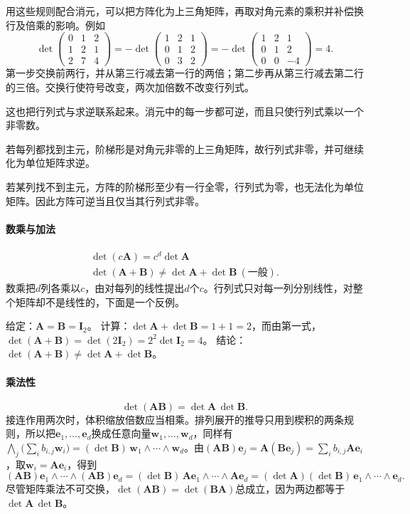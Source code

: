 用这些规则配合消元，可以把方阵化为上三角矩阵，再取对角元素的乘积并补偿换行及倍乘的影响。例如
\[
 \det\begin{pmatrix}0&1&2\\1&2&1\\2&7&4\end{pmatrix}
 =-\det\begin{pmatrix}1&2&1\\0&1&2\\0&3&2\end{pmatrix}
 =-\det\begin{pmatrix}1&2&1\\0&1&2\\0&0&-4\end{pmatrix}=4.
\]
第一步交换前两行，并从第三行减去第一行的两倍；第二步再从第三行减去第二行的三倍。交换行使符号改变，两次加倍数不改变行列式。

这也把行列式与求逆联系起来。消元中的每一步都可逆，而且只使行列式乘以一个非零数。

若每列都找到主元，阶梯形是对角元非零的上三角矩阵，故行列式非零，并可继续化为单位矩阵求逆。

若某列找不到主元，方阵的阶梯形至少有一行全零，行列式为零，也无法化为单位矩阵。因此方阵可逆当且仅当其行列式非零。

\paragraph{数乘与加法}
\[
\begin{gathered}
\det(c\bm A)=c^d\det\bm A\\
\det(\bm A+\bm B)\neq\det\bm A+\det\bm B\ (\text{一般}).
\end{gathered}
\]
数乘把$d$列各乘以$c$，由对每列的线性提出$d$个$c$。行列式只对每一列分别线性，对整个矩阵却不是线性的，下面是一个反例。
\begin{example}[反例：行列式不保持加法]
\label{ex:ls-det-not-additive}
给定：$\bm A=\bm B=\bm I_2$。
计算：$\det\bm A+\det\bm B=1+1=2$，而由第一式，$\det(\bm A+\bm B)=\det(2\bm I_2)=2^2\det\bm I_2=4$。
结论：$\det(\bm A+\bm B)\neq\det\bm A+\det\bm B$。
\end{example}

\paragraph{乘法性}
\[
 \det(\bm A\bm B)=\det\bm A\,\det\bm B.
\]
接连作用两次时，体积缩放倍数应当相乘。排列展开的推导只用到楔积的两条规则，所以把$\bm e_1,\ldots,\bm e_d$换成任意向量$\bm w_1,\ldots,\bm w_d$，同样有$\bigwedge_j\bigl(\sum_ib_{i,j}\bm w_i\bigr)=(\det\bm B)\,\bm w_1\wedge\cdots\wedge\bm w_d$。由$(\bm A\bm B)\bm e_j=\bm A(\bm B\bm e_j)=\sum_i b_{i,j}\bm A\bm e_i$，取$\bm w_i=\bm A\bm e_i$，得到
\[
 (\bm A\bm B)\bm e_1\wedge\cdots\wedge(\bm A\bm B)\bm e_d
 =(\det\bm B)\,\bm A\bm e_1\wedge\cdots\wedge\bm A\bm e_d
 =(\det\bm A)(\det\bm B)\,\bm e_1\wedge\cdots\wedge\bm e_d.
\]
尽管矩阵乘法不可交换，$\det(\bm A\bm B)=\det(\bm B\bm A)$总成立，因为两边都等于$\det\bm A\,\det\bm B$。

